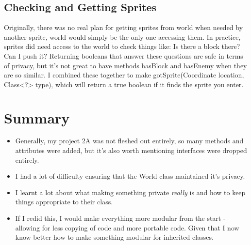 \documentclass{article}
\begin{document}
\subsection{Checking and Getting Sprites}
Originally, there was no real plan for getting sprites from world when needed by another sprite, world would simply be the only one accessing them. In practice, sprites did need access to the world to check things like: Is there a block there? Can I push it? Returning booleans that answer these questions are safe in terms of privacy, but it's not great to have methods hasBlock and hasEnemy when they are so similar. I combined these together to make gotSprite(Coordinate location, Class<?> type), which will return a true boolean if it finds the sprite you enter.

\section{Summary}
\begin{itemize}
    \item Generally, my project 2A was not fleshed out entirely, so many methods and attributes were added, but it's also worth mentioning interfaces were dropped entirely.
    \item I had a lot of difficulty ensuring that the World class maintained it's privacy.
    \item I learnt a lot about what making something private \textit{really} is and how to keep things appropriate to their class.
    \item If I redid this, I would make everything more modular from the start - allowing for less copying of code and more portable code. Given that I now know better how to make something modular for inherited classes.
\end{itemize}
\end{document}
